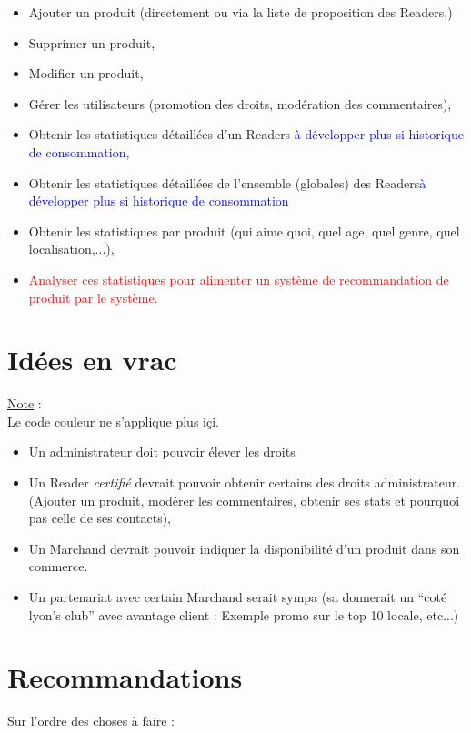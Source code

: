 \documentclass[a4paper,12pt,twoside]{article}
\newcommand{\note}[1]{\noindent\underline{Note} : \\ \indent #1}
\begin{document}
\begin{itemize}
 \item Ajouter un produit (directement ou via la liste de proposition des Readers,)
 \item Supprimer un produit, 
 \item Modifier un produit, 
 \item Gérer les utilisateurs (promotion des droits, modération des commentaires),
 \item Obtenir les statistiques détaillées d'un Readers \textcolor{blue}{à développer plus si historique de consommation},
 \item Obtenir les statistiques détaillées de l'ensemble (globales) des Readers\textcolor{blue}{à développer plus si historique de consommation}
 \item Obtenir les statistiques par produit (qui aime quoi, quel age, quel genre, quel localisation,...),
 \item \textcolor{red}{Analyser ces statistiques pour alimenter un système de recommandation de produit par le système.}
\end{itemize}
 
\section{Idées en vrac}
\note{Le code couleur ne s'applique plus içi}. \\

\begin{itemize}
 \item Un administrateur doit pouvoir élever les droits
 \item Un Reader \textit{certifié} devrait pouvoir obtenir certains des droits administrateur. (Ajouter un produit, modérer les commentaires, obtenir ses stats et pourquoi pas celle de ses contacts),
 \item Un Marchand devrait pouvoir indiquer la disponibilité d'un produit dans son commerce. 
 \item Un partenariat avec certain Marchand serait sympa (sa donnerait un ``coté lyon's club'' avec avantage client : Exemple promo sur le top 10 locale, etc...)
\end{itemize}

\section{Recommandations}
Sur l'ordre des choses à faire : \\
\end{document}
